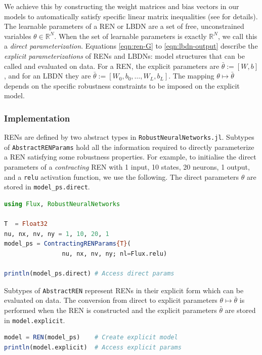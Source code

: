 We achieve this by constructing the weight matrices and bias vectors in our models to automatically satisfy specific linear matrix inequalities (see \cite{Revay++2021b} for details). The learnable parameters of a REN or LBDN are a set of free, unconstrained variables $\theta \in \mathbb{R}^N$. When the set of learnable parameters is exactly $\mathbb{R}^N$, we call this a \textit{direct parameterization}. Equations \ref{eqn:ren-G} to \ref{eqn:lbdn-output} describe the \textit{explicit parameterizations} of RENs and LBDNs: model structures that can be called and evaluated on data. For a REN, the explicit parameters are $\bar{\theta} := [W, b]$, and for an LBDN they are $\bar{\theta} := [W_0, b_0, \ldots, W_L, b_L]$. The mapping $\theta \mapsto \bar{\theta}$ depends on the specific robustness constraints to be imposed on the explicit model. 

\subsubsection{Implementation} \label{sec:params-implementation}
RENs are defined by two abstract types in \verb|RobustNeuralNetworks.jl|. Subtypes of \verb|AbstractRENParams| hold all the information required to directly parameterize a REN satisfying some robustness properties. For example, to initialise the direct parameters of a \textit{contracting} REN with 1 input, 10 states, 20 neurons, 1 output, and a \texttt{relu} activation function, we use the following. The direct parameters $\theta$ are stored in \verb|model_ps.direct|. 

\begin{lstlisting}[language = Julia]
using Flux, RobustNeuralNetworks

T  = Float32
nu, nx, nv, ny = 1, 10, 20, 1
model_ps = ContractingRENParams{T}(
                nu, nx, nv, ny; nl=Flux.relu)
                
println(model_ps.direct) # Access direct params
\end{lstlisting}

Subtypes of \verb|AbstractREN| represent RENs in their explicit form which can be evaluated on data. The conversion from direct to explicit parameters $\theta \mapsto \bar{\theta}$ is performed when the REN is constructed and the explicit parameters $\bar{\theta}$ are stored in \verb|model.explicit|.

\begin{lstlisting}[language = Julia]
model = REN(model_ps)    # Create explicit model
println(model.explicit)  # Access explicit params
\end{lstlisting}

